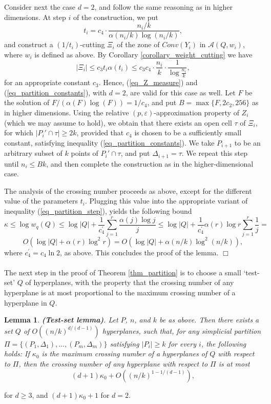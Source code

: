 \documentclass[11pt]{article}
\newtheorem{lemma}[theorem]{Lemma}
\def\peps{(p,\varepsilon)}
\begin{document}
Consider next the case $d = 2$, and follow the same reasoning as in higher dimensions. At step $i$ of the construction, we put
$$
t_{i} = c_{4} \cdot \frac{n_{i}/k}{\alpha(n_{i}/k) \log (n_{i}/k)},
$$
and construct a $(1/t_{i})$-cutting $\Xi_{i}$ of the zone of $Conv(Y_{i})$ in $\mathcal{A}(Q,w_{i})$, where $w_{i}$ is defined as above. By Corollary \ref{corollary_weight_cutting} we have
$$
|\Xi_{i}| \leq c_{3} t_{i}\alpha(t_{i}) \leq c_{3}c_{4} \cdot \frac{n_{i}}{k} \cdot \frac{1}{\log\frac{n_{i}}{k}},
$$
for an appropriate constant $c_{3}$. Hence, (\ref{eq_Z_measure}) and (\ref{eq_partition_constants}), with $d = 2$, are valid for this case as well. Let $F$ be the solution of $F/(\alpha(F)\log(F)) = 1/c_{4}$, and put $B = \max\{F, 2c_{2}, 256\}$ as in higher dimensions. Using the relative $\peps$-approximation property of $Z_{i}$ (which we may assume to hold), we obtain that there exists an open cell $\tau$ of $\Xi_{i}$, for which $|P_{i}' \cap \tau| \geq 2k$, provided that $c_{4}$ is chosen to be a sufficiently small constant, satisfying inequality (\ref{eq_partition_constants}). We take $P_{i+1}$ to be an arbitrary subset of $k$ points of $P_{i}' \cap \tau$, and put $\Delta_{i+1} = \tau$. We repeat this step until $n_{i} \leq Bk$, and then complete the construction as in the higher-dimensional case.

The analysis of the crossing number proceeds as above, except for the different value of the parameters $t_{i}$. Plugging this value into the appropriate variant of inequality (\ref{eq_partition_step}), yields the following bound
$$
\kappa \leq \log w_{q}(Q) \leq \log |Q| + \frac{1}{c_{4}^{'}} \sum_{j=1}^{r}\frac{\alpha(j) \log j }{j} \leq \log |Q| + \frac{1}{c_{4}^{'}} \alpha(r) \log r \sum_{j=1}^{r} \frac{1}{j} =
$$
$$
O\left(\log |Q| + \alpha(r) \log^{2}r \right) = O\left(\log |Q| + \alpha(n/k) \log^{2}(n/k) \right),
$$
where $c_{4}^{'} = c_{4}\ln 2$, as above. This concludes the proof of the lemma. $\Box$


\paragraph{}
The next step in the proof of Theorem \ref{thm_partition} is to choose a small `test-set' $Q$ of hyperplanes, with the property that the crossing number of any hyperplane is at most proportional to the maximum crossing number of a hyperplane in $Q$.

\begin{lemma} \label{lemma_test-set}
\emph{{\bf(Test-set lemma)}}.
Let $P$, $n$, and $k$ be as above. Then there exists a set $Q$ of $O((n/k)^{d/(d-1)})$ hyperplanes, such that, for any simplicial partition $\Pi = \{(P_{1},\Delta_{1}), \ldots,(P_{m},\Delta_{m})\}$ satisfying $\left| P_{i} \right| \geq k$ for every $i$, the following holds: If $\kappa_{0}$ is the maximum crossing number of a hyperplanes of $Q$ with respect to $\Pi$, then the crossing number of any hyperplane with respect to $\Pi$ is at most
$$
(d + 1)\kappa_{0} + O\left((n/k)^{1-1/(d-1)} \right),
$$
\end{lemma}
for $d \geq 3$, and $(d + 1)\kappa_{0} + 1$ for $d = 2$.
\end{document}
